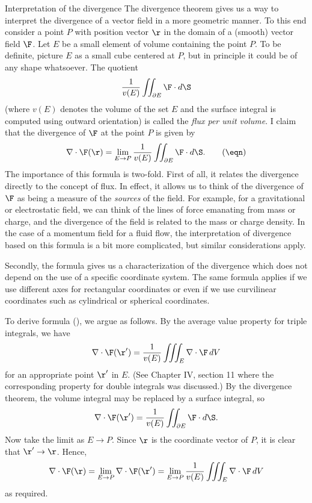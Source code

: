 \subhead Interpretation of the divergence \endsubhead
The divergence theorem gives us a way to interpret the divergence
of a vector field in a more geometric manner.  To this end
consider a point $P$ with position vector $\r$ in the domain
of a (smooth) vector field $\F$.  Let $E$ be a small element of
volume containing the point $P$.  To be definite, picture $E$
as a small cube centered at $P$, but in principle it could be
of any shape whatsoever.  The quotient
$$
      \frac 1 {v(E)} \iint_{\partial E} \F\cdot d\S
$$
(where $v(E)$ denotes the volume of the set $E$
and the surface integral is computed using outward orientation)
is called the {\it flux per unit volume}.   I claim that
the divergence of $\F$ at the point $P$ is given by
\nexteqn
$$
   \nabla\cdot \F(\r) = \lim_{E \to P}
\frac 1 {v(E)} \iint_{\partial E} \F\cdot d\S.\tag\eqn
$$
%
 The importance of this formula is two-fold.  First of all,
it relates the divergence directly to the concept of flux.
In effect, it allows us to think of the divergence of $\F$
as being a measure of the {\it sources\/} of the field.
For example, for a gravitational or electrostatic field,
we can think of the lines of force emanating from mass
or charge, and the divergence of the field is related to
the mass or charge density.  In the case of a momentum field
for a fluid flow, the interpretation of divergence based on
this formula is a bit more complicated, but similar considerations
apply.   

Secondly, the formula gives us a characterization of the divergence
which does not depend on the use of a specific coordinate system.
The same formula applies if we use different axes for rectangular
coordinates or even if we use curvilinear coordinates such as
cylindrical or spherical coordinates.   

To derive formula (\eqn), we argue as follows.  By the average
value property for triple integrals, we have
$$
    \nabla\cdot \F(\r') = \frac 1{v(E)} \iiint_E \nabla\cdot \F\,dV
$$
for an appropriate point $\r'$ in $E$.  (See Chapter IV, section
11 where the corresponding property for double integrals was discussed.)
By the divergence theorem, the volume integral may be replaced by
a surface integral, so
$$
 \nabla\cdot \F(\r') = 
\frac 1{v(E)} \iint_{\partial E} \F\cdot d\S.
$$
Now take the limit as $E \to P$.  Since $\r$ is the coordinate
vector of $P$, it is clear that $\r' \to \r$.  Hence,
$$
\nabla\cdot \F(\r) =
\lim_{E\to P}\nabla\cdot \F(\r')
 = \lim_{E\to P} \frac 1{v(E)} \iiint_E \nabla\cdot \F\,dV
$$
as required.

